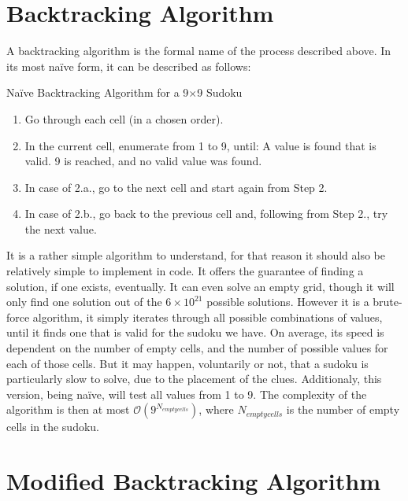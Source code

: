 \documentclass[12pt]{report} %
\begin{document}
\newpage
\section{Backtracking Algorithm}

A backtracking algorithm is the formal name of the process described above\cite{cornell_sudoku}. In its most naïve form, it can be described as follows:


\begin{definitionbox}{Naïve Backtracking Algorithm for a 9$\times$9 Sudoku}

  \begin{enumerate}
    \item Go through each cell (in a chosen order).
    \item In the current cell, enumerate from 1 to 9, until:
     A value is found that is valid.
     9 is reached, and no valid value was found.
    \item In case of 2.a., go to the next cell and start again from Step 2.
    \item In case of 2.b., go back to the previous cell and, following from Step 2., try the next value.
  \end{enumerate}

\end{definitionbox}

\vspace*{1\baselineskip}
It is a rather simple algorithm to understand, for that reason it should also be relatively simple to implement in code. It offers the guarantee of finding a solution, if one exists, eventually. It can even solve an empty grid, though it will only find one solution out of the $6 \times 10^{21}$ possible solutions\cite{cornell_sudoku3}.
However it is a brute-force algorithm, it simply iterates through all possible combinations of values, until it finds one that is valid for the sudoku we have. On average, its speed is dependent on the number of empty cells, and the number of possible values for each of those cells. But it may happen, voluntarily or not, that a sudoku is particularly slow to solve, due to the placement of the clues. Additionaly, this version, being naïve, will test all values from 1 to 9. The complexity of the algorithm is then at most $\mathcal{O}(9^{N_{empty cells}})$, where $N_{empty cells}$ is the number of empty cells in the sudoku.

\section{Modified Backtracking Algorithm}
\end{document}
